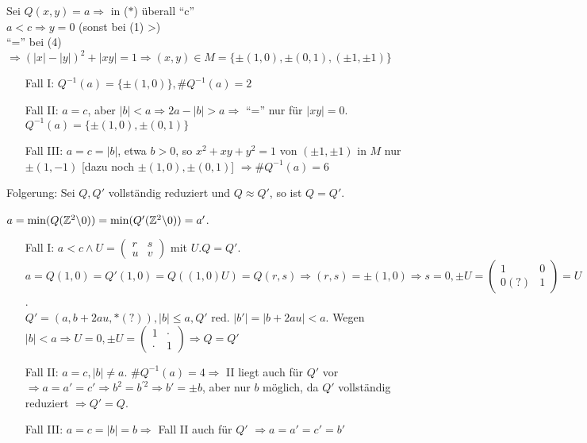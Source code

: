 \documentclass[a4paper,DIV15,BCOR12mm]{article}
\begin{document}
Sei $Q(x,y) = a \Rightarrow$ in ($\ast$) überall "`c"'\\
$a < c \Rightarrow y = 0$ (sonst bei (1) >)\\
"`="' bei (4) $\Rightarrow (|x|-|y|)^2 + |xy| = 1 \Rightarrow (x,y) \in M = \{\pm (1,0), \pm (0,1), (\pm 1, \pm 1)\}$
\begin{itemize}
\item[Fall I:] $Q^{-1}(a) = \{\pm (1,0)\}, \# Q^{-1}(a) = 2$
\item[Fall II:] $a = c$, aber $|b| < a \Rightarrow 2a-|b| > a \Rightarrow$ "`="' nur für $|xy| = 0$. $Q^{-1}(a) = \{\pm (1,0), \pm (0,1)\}$
\item[Fall III:] $a = c = |b|$, etwa $b > 0$, so $x^2 + xy + y^2 = 1$ von $(\pm 1, \pm 1)$ in $M$ nur $\pm (1, -1)$ [dazu noch $\pm (1,0), \pm(0,1)$] $\Rightarrow \#Q^{-1}(a) = 6$
\end{itemize}

Folgerung: Sei $Q, Q'$ vollständig reduziert und $Q \approx Q'$, so ist $Q = Q'$.
\begin{beweis}
$a = \min (Q(\mathbb{Z}^2 \backslash 0)) = \min (Q'(\mathbb{Z}^2 \backslash 0)) = a'$.
\begin{itemize}
\item[Fall I:] $a < c \wedge U = \begin{pmatrix}r & s \\ u & v\end{pmatrix}$ mit $U.Q = Q'$. $a = Q(1,0) = Q'(1,0) = Q((1,0)U) = Q(r,s) \Rightarrow (r,s) = \pm (1,0) \Rightarrow s = 0, \pm U = \begin{pmatrix}1 & 0\\ 0(?) & 1\end{pmatrix} = U$.\\
$Q' = (a,b + 2au, \ast (?)), |b| \le a, Q' \text{ red}$. $|b'| = |b + 2au| < a$. Wegen $|b| < a \Rightarrow U = 0, \pm U = \begin{pmatrix}1 & \cdot\\ \cdot & 1\end{pmatrix} \Rightarrow Q = Q'$
\item[Fall II:] $a = c, |b| \not= a$. $\# Q^{-1}(a) = 4 \Rightarrow$ II liegt auch für $Q'$ vor $\Rightarrow a = a' = c' \Rightarrow b^2 = b^{'2} \Rightarrow b' = \pm b$, aber nur $b$ möglich, da $Q'$ vollständig reduziert $\Rightarrow Q' = Q$.
\item[Fall III:] $a = c = |b| = b \Rightarrow$ Fall II auch für $Q'$ $\Rightarrow a = a' = c' = b'$
\end{itemize}
\end{beweis}
\end{document}
